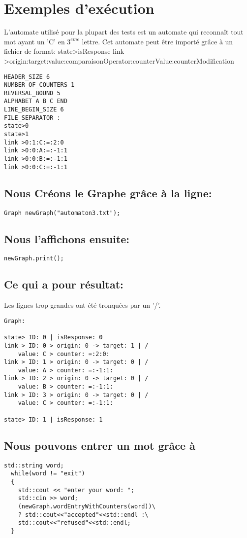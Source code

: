 \section{Exemples d'exécution}
L'automate utilisé pour la plupart des tests est un automate qui reconnaît tout mot ayant un 'C' en $3^{eme}$ lettre. Cet automate peut être importé grâce à un fichier de format:
state>isResponse
link >origin:target:value:comparaisonOperator:counterValue:counterModification
\begin{verbatim}
HEADER_SIZE 6
NUMBER_OF_COUNTERS 1
REVERSAL_BOUND 5
ALPHABET A B C END
LINE_BEGIN_SIZE 6
FILE_SEPARATOR :
state>0
state>1
link >0:1:C:=:2:0
link >0:0:A:=:-1:1
link >0:0:B:=:-1:1
link >0:0:C:=:-1:1
\end{verbatim}

\subsection{Nous Créons le Graphe grâce à la ligne:}
\begin{verbatim}
Graph newGraph("automaton3.txt");
\end{verbatim}

\subsection{Nous l'affichons ensuite:}
\begin{verbatim}
newGraph.print();
\end{verbatim}

\subsection{Ce qui a pour résultat:}
Les lignes trop grandes ont été tronquées par un '/'.
\begin{verbatim}
Graph:

state> ID: 0 | isResponse: 0
link > ID: 0 > origin: 0 -> target: 1 | /
    value: C > counter: =:2:0:
link > ID: 1 > origin: 0 -> target: 0 | /
    value: A > counter: =:-1:1:
link > ID: 2 > origin: 0 -> target: 0 | /
    value: B > counter: =:-1:1:
link > ID: 3 > origin: 0 -> target: 0 | /
    value: C > counter: =:-1:1:

state> ID: 1 | isResponse: 1

\end{verbatim}

\subsection{Nous pouvons entrer un mot grâce à}
\begin{verbatim}
std::string word;
  while(word != "exit")
  {
    std::cout << "enter your word: ";
    std::cin >> word;
    (newGraph.wordEntryWithCounters(word))\
    ? std::cout<<"accepted"<<std::endl :\
    std::cout<<"refused"<<std::endl;
  }
\end{verbatim}

